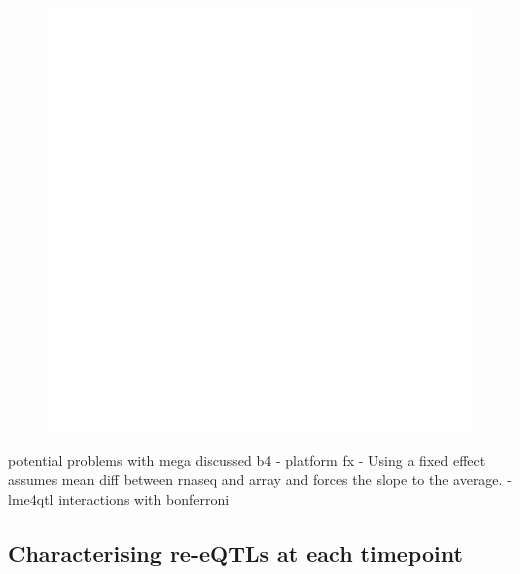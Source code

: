 \begin{figure}
    \centering
    \includegraphics[width=1.0\textwidth,page=2]{mainmatter/figures/chapter_03/get_signif_qtls.upset.eGenes_sharing_no_ties_joint.dataset_mega.groups_v2_v3_v4.cisDist_1e6.sampleAcThresh_15.randomSubsetN_200000.signifThresh_0.05.pdf}
    \caption{}
    \label{fig:hird_eQTL_upset_mega}
\end{figure}


potential problems with mega discussed b4
- platform fx
- Using a fixed effect assumes mean diff between rnaseq and array and forces the slope to the average.
- lme4qtl interactions with bonferroni

\subsection{Characterising re-eQTLs at each timepoint}


